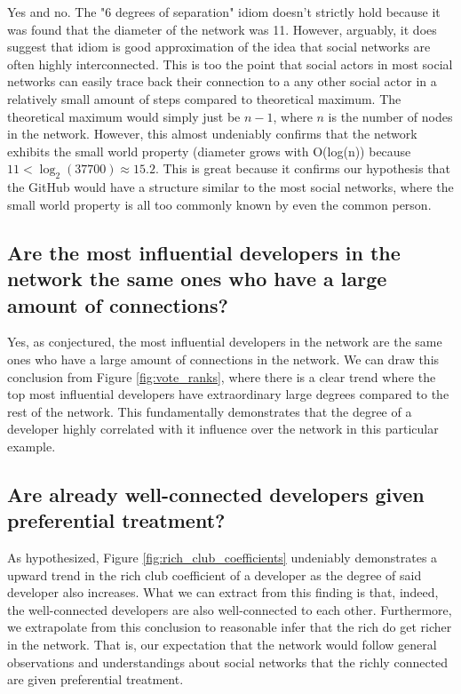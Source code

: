 \documentclass[9pt,twocolumn,twoside]{pnas-new}
\begin{document}
Yes and no. The "6 degrees of separation" idiom doesn't strictly hold because it was found that the diameter of the network was 11. However, arguably, it does suggest that idiom is good approximation of the idea that social networks are often highly interconnected. This is too the point that social actors in most social networks can easily trace back their connection to a any other social actor in a relatively small amount of steps compared to theoretical maximum. The theoretical maximum would simply just be $n-1$, where $n$ is the number of nodes in the network. However, this almost undeniably confirms that the network exhibits the small world property (diameter grows with O(log(n)) because $11 < \log_{2}\left(37700\right) \approx 15.2$. This is great because it confirms our hypothesis that the GitHub would have a structure similar to the most social networks, where the small world property is all too commonly known by even the common person.

\subsection*{Are the most influential developers in the network the same ones who have a large amount of connections?}

Yes, as conjectured, the most influential developers in the network are the same ones who have a large amount of connections in the network. We can draw this conclusion from Figure \ref{fig:vote_ranks}, where there is a clear trend where the top most influential developers have extraordinary large degrees compared to the rest of the network. This fundamentally demonstrates that the degree of a developer highly correlated with it influence over the network in this particular example.

\subsection*{Are already well-connected developers given preferential treatment?}

As hypothesized, Figure \ref{fig:rich_club_coefficients} undeniably demonstrates a upward trend in the rich club coefficient of a developer as the degree of said developer also increases. What we can extract from this finding is that, indeed, the well-connected developers are also well-connected to each other. Furthermore, we extrapolate from this conclusion to reasonable infer that the rich do get richer in the network. That is, our expectation that the network would follow general observations and understandings about social networks that the richly connected are given preferential treatment.
\end{document}
